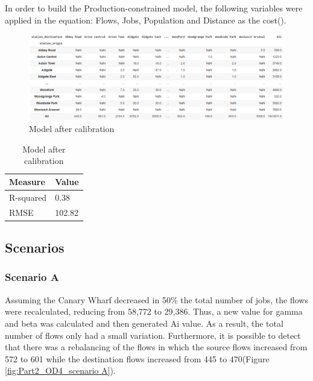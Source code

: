 \documentclass[10pt]{report}
\numberwithin{figure}{section}
\numberwithin{table}{section}
\begin{document}
In order to build the Production-constrained model, the following variables were applied in the equation: Flows, Jobs, Population and Distance as the cost(\cite{neira_working_2022}). 

    \begin{figure}[htp]
        \centering
        \includegraphics[width=16cm]{Image/Part2_OD2.png}
        \caption{Model after calibration}
        \label{fig: Model after calibration}
    \end{figure}

\vspace{5mm} %

    \begin{table}[h]
    \centering
    \begin{tabular}{@{}ll@{}}
    \toprule
    \textbf{Measure} & \textbf{Value} \\ \midrule
    R-squared        & 0.38           \\
    RMSE             & 102.82     
    \end{tabular}
    \caption{Model after calibration}
    \label{table: calibration}
    \end{table}

\newpage    

\subsection{Scenarios}
\subsubsection{Scenario A}

Assuming the Canary Wharf decreased in 50\% the total number of jobs, the flows were recalculated, reducing from 58,772 to 29,386. Thus, a new value for gamma and beta was calculated and then generated Ai value. As a result, the total number of flows only had a small variation. Furthermore, it is possible to detect that there was a rebalancing of the flows in which the source flows increased from 572 to 601 while the destination flows increased from 445 to 470(Figure \ref{fig:Part2_OD4_scenario A}).
\end{document}
